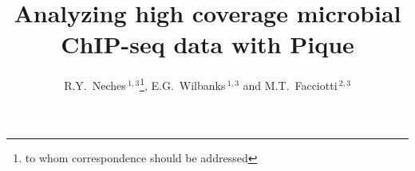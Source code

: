 \documentclass{bioinfo}
\begin{document}

\title[In a fit of pique]{Analyzing high coverage microbial ChIP-seq
  data with Pique} \author[Neches
\textit{et~al}]{R.Y.~Neches\,$^{1,3}$\footnote{to whom correspondence
    should be addressed}, E.G.~Wilbanks\,$^{1,3}$ and
  M.T.~Facciotti\,$^{2,3}$
  \address{$^{1}$Microbiology Graduate Group, University of California, Davis.\\
    $^{2}$Department of Biomedical Engineering, University of
    California, Davis.\\$^{3}$Genome Center, University of California,
    Davis.}}



\maketitle

\end{document}
